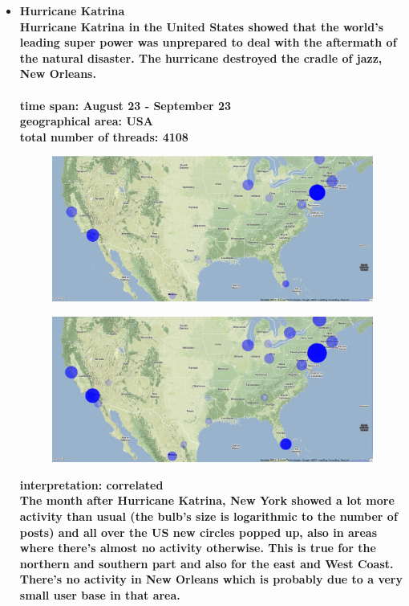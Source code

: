 \documentclass[11pt,a4paper,english]{article}
\begin{document}
\begin{itemize}
						
				\item \bf Hurricane Katrina \rm
					\\ Hurricane Katrina in the United States showed that the world's leading super power was unprepared to deal with the aftermath of the natural disaster. The hurricane destroyed the cradle of jazz, New Orleans. 
					\\\\ \bf time span: \rm August 23 - September 23
					\\ \bf geographical area: \rm USA
					\\ \bf total number of threads: \rm 4108
					\begin{figure}[H]
						\vspace{-5pt}
  							\begin{center}
								\includegraphics[width=130mm]{img/pre-katrina}
							\end{center}
							\vspace{-13pt}
					\end{figure}
					\begin{figure}[H]
						\vspace{-10pt}
						\begin{center}
							\includegraphics[width=130mm]{img/post-katrina}
						\end{center}					
						\vspace{-5pt}
					\end{figure}
					
					\bf interpretation: \rm correlated
					\\ The month after Hurricane Katrina, New York showed a lot more activity than usual (the bulb's size is logarithmic to the number of posts) and all over the US new circles popped up, also in areas where there's almost no activity otherwise. This is true for the northern and southern part and also for the east and West Coast. There's no activity in New Orleans which is probably due to a very small user base in that area.
					
					
\newpage												
				\end{itemize}
			
\end{document}
